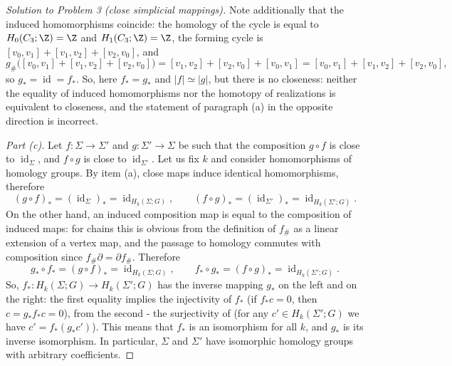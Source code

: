 \documentclass[a4paper,12pt]{report}
\begin{document}
\begin{proof}[Solution to Problem \textup{3} \textup{(}close simplicial mappings\textup{)}]
Note additionally that the induced homomorphisms coincide: the homology of the cycle is equal to $H_0(C_3;\Z)=\Z$ and $H_1(C_3;\Z)=\Z$, the forming cycle is $[v_0,v_1]+[v_1,v_2]+[v_2,v_0]$, and
\[
g_\#\bigl([v_0,v_1]+[v_1,v_2]+[v_2,v_0]\bigr)=[v_1,v_2]+[v_2,v_0]+[v_0,v_1]=[v_0,v_1]+[v_1,v_2]+[v_2,v_0],
\]
so $g_*=\operatorname{id}=f_*$. So, here $f_*=g_*$ and $|f|\simeq|g|$, but there is no closeness: neither the equality of induced homomorphisms nor the homotopy of realizations is equivalent to closeness, and the statement of paragraph \textup{(a)} in the opposite direction is incorrect.

\textit{Part \textup{(c)}.} Let $f\colon\Sigma\to\Sigma'$ and $g\colon\Sigma'\to\Sigma$ be such that the composition $g\circ f$ is close to $\operatorname{id}_\Sigma$, and $f\circ g$ is close to $\operatorname{id}_{\Sigma'}$. Let us fix $k$ and consider homomorphisms of homology groups. By item \textup{(a)}, close maps induce identical homomorphisms, therefore
\[
(g\circ f)_*=( \operatorname{id}_\Sigma)_*=\operatorname{id}_{H_k(\Sigma;G)},\qquad
(f\circ g)_*=(\operatorname{id}_{\Sigma'})_*=\operatorname{id}_{H_k(\Sigma';G)} .
\]
On the other hand, an induced composition map is equal to the composition of induced maps: for chains this is obvious from the definition of $f_\#$ as a linear extension of a vertex map, and the passage to homology commutes with composition since $f_\#\partial=\partial f_\#$. Therefore
\[
g_*\circ f_*=(g\circ f)_*=\operatorname{id}_{H_k(\Sigma;G)},\qquad
f_*\circ g_*=(f\circ g)_*=\operatorname{id}_{H_k(\Sigma';G)} .
\]
So, $f_*\colon H_k(\Sigma;G)\to H_k(\Sigma';G)$ has the inverse mapping $g_*$ on the left and on the right: the first equality implies the injectivity of $f_*$ \textup{(}if $f_*c=0$, then $c=g_*f_*c=0$\textup{)}, from the second - the surjectivity of \textup{(}for any $c'\in H_k(\Sigma';G)$ we have $c'=f_*(g_*c')$\textup{)}. This means that $f_*$ is an isomorphism for all $k$, and $g_*$ is its inverse isomorphism. In particular, $\Sigma$ and $\Sigma'$ have isomorphic homology groups with arbitrary coefficients.
\end{proof}
\end{document}

